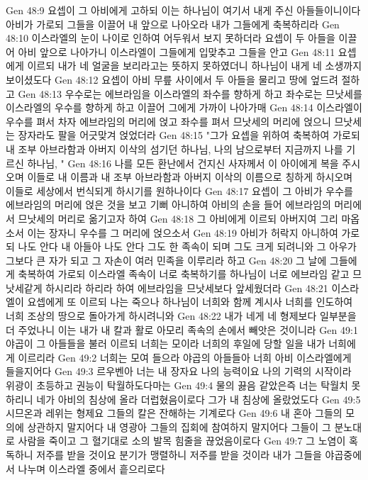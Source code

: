 Gen 48:9  요셉이 그 아비에게 고하되 이는 하나님이 여기서 내게 주신 아들들이니이다 아비가 가로되 그들을 이끌어 내 앞으로 나아오라 내가 그들에게 축복하리라
Gen 48:10  이스라엘의 눈이 나이로 인하여 어두워서 보지 못하더라 요셉이 두 아들을 이끌어 아비 앞으로 나아가니 이스라엘이 그들에게 입맞추고 그들을 안고
Gen 48:11  요셉에게 이르되 내가 네 얼굴을 보리라고는 뜻하지 못하였더니 하나님이 내게 네 소생까지 보이셨도다
Gen 48:12  요셉이 아비 무릎 사이에서 두 아들을 물리고 땅에 엎드려 절하고
Gen 48:13  우수로는 에브라임을 이스라엘의 좌수를 향하게 하고 좌수로는 므낫세를 이스라엘의 우수를 향하게 하고 이끌어 그에게 가까이 나아가매
Gen 48:14  이스라엘이 우수를 펴서 차자 에브라임의 머리에 얹고 좌수를 펴서 므낫세의 머리에 얹으니 므낫세는 장자라도 팔을 어긋맞겨 얹었더라
Gen 48:15  "그가 요셉을 위하여 축복하여 가로되 내 조부 아브라함과 아버지 이삭의 섬기던 하나님, 나의 남으로부터 지금까지 나를 기르신 하나님, "
Gen 48:16  나를 모든 환난에서 건지신 사자께서 이 아이에게 복을 주시오며 이들로 내 이름과 내 조부 아브라함과 아버지 이삭의 이름으로 칭하게 하시오며 이들로 세상에서 번식되게 하시기를 원하나이다
Gen 48:17  요셉이 그 아비가 우수를 에브라임의 머리에 얹은 것을 보고 기뻐 아니하여 아비의 손을 들어 에브라임의 머리에서 므낫세의 머리로 옮기고자 하여
Gen 48:18  그 아비에게 이르되 아버지여 그리 마옵소서 이는 장자니 우수를 그 머리에 얹으소서
Gen 48:19  아비가 허락지 아니하여 가로되 나도 안다 내 아들아 나도 안다 그도 한 족속이 되며 그도 크게 되려니와 그 아우가 그보다 큰 자가 되고 그 자손이 여러 민족을 이루리라 하고
Gen 48:20  그 날에 그들에게 축복하여 가로되 이스라엘 족속이 너로 축복하기를 하나님이 너로 에브라임 같고 므낫세같게 하시리라 하리라 하여 에브라임을 므낫세보다 앞세웠더라
Gen 48:21  이스라엘이 요셉에게 또 이르되 나는 죽으나 하나님이 너희와 함께 계시사 너희를 인도하여 너희 조상의 땅으로 돌아가게 하시려니와
Gen 48:22  내가 네게 네 형제보다 일부분을 더 주었나니 이는 내가 내 칼과 활로 아모리 족속의 손에서 빼앗은 것이니라
Gen 49:1  야곱이 그 아들들을 불러 이르되 너희는 모이라 너희의 후일에 당할 일을 내가 너희에게 이르리라
Gen 49:2  너희는 모여 들으라 야곱의 아들들아 너희 아비 이스라엘에게 들을지어다
Gen 49:3  르우벤아 너는 내 장자요 나의 능력이요 나의 기력의 시작이라 위광이 초등하고 권능이 탁월하도다마는
Gen 49:4  물의 끓음 같았은즉 너는 탁월치 못하리니 네가 아비의 침상에 올라 더럽혔음이로다 그가 내 침상에 올랐었도다
Gen 49:5  시므온과 레위는 형제요 그들의 칼은 잔해하는 기계로다
Gen 49:6  내 혼아 그들의 모의에 상관하지 말지어다 내 영광아 그들의 집회에 참여하지 말지어다 그들이 그 분노대로 사람을 죽이고 그 혈기대로 소의 발목 힘줄을 끊었음이로다
Gen 49:7  그 노염이 혹독하니 저주를 받을 것이요 분기가 맹렬하니 저주를 받을 것이라 내가 그들을 야곱중에서 나누며 이스라엘 중에서 흩으리로다
